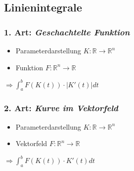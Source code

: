 \pagebreak

\subsection{Linienintegrale}
\subsubsection{1. Art: \textit{Geschachtelte Funktion}}
\begin{itemize}
	\item Parameterdarstellung $K: \mathbb{R} \rightarrow \mathbb{R}^n$
	\item Funktion $F: \mathbb{R}^n \rightarrow \mathbb{R}$
\end{itemize}
$\Rightarrow \int_a^b F(K(t)) \cdot |K'(t)| dt$

\subsubsection{2. Art: \textit{Kurve im Vektorfeld}}
\begin{itemize}
	\item Parameterdarstellung $K: \mathbb{R} \rightarrow \mathbb{R}^n$
	\item Vektorfeld $F: \mathbb{R}^n \rightarrow \mathbb{R}$
\end{itemize}
$\Rightarrow \int_a^b F(K(t)) \cdot K'(t) dt$
